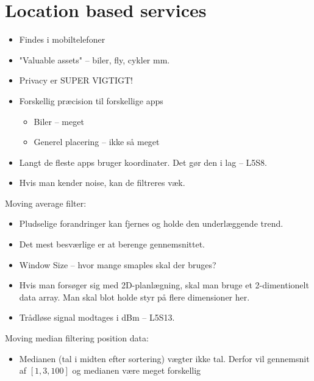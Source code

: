 \documentclass[oneside, 10pt]{article}
\begin{document}
\newpage
\section{Location based services}

\begin{itemize}
	\item Findes i mobiltelefoner
	\item "Valuable assets" --  biler, fly, cykler mm.
	\item Privacy er SUPER VIGTIGT!
	\item Forskellig præcision til forskellige apps
	\begin{itemize}
		\item Biler -- meget
		\item Generel placering -- ikke så meget
	\end{itemize}

	\item Langt de fleste apps bruger koordinater. Det gør den i lag -- L5S8.
	\item Hvis man kender noise, kan de filtreres væk.
\end{itemize}

Moving average filter:
\begin{itemize}
	\item Pludselige forandringer kan fjernes og holde den underlæggende trend.
	\item Det mest besværlige er at berenge gennemsnittet.
	\item Window Size -- hvor mange smaples skal der bruges?
	\item Hvis man forsøger sig med 2D-planlægning, skal man bruge et 2-dimentionelt data array. Man skal blot holde styr på flere dimensioner her.
	\item Trådløse signal modtages i dBm -- L5S13.
\end{itemize}

Moving median filtering position data:
\begin{itemize}
	\item Medianen (tal i midten efter sortering) vægter ikke tal. Derfor vil gennemsnit af $[1, 3, 100 ]$ og medianen være meget forskellig
\end{itemize}
\end{document}
